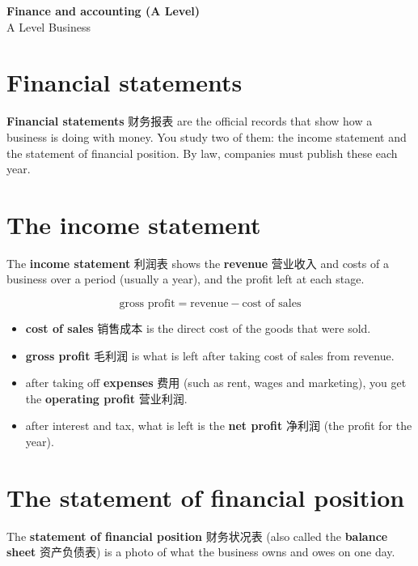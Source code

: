 \documentclass[11pt]{article}
\begin{document}
\begin{center}
  {\LARGE\bfseries Finance and accounting (A Level)}\\[0.35em]
  {\large A Level Business}
\end{center}
\vspace{0.6em}

\section*{Financial statements}

\textbf{Financial statements} 财务报表 are the official records that show how a business is doing with money. You study two of them: the income statement and the statement of financial position. By law, companies must publish these each year.

\section*{The income statement}

The \textbf{income statement} 利润表 shows the \textbf{revenue} 营业收入 and costs of a business over a period (usually a year), and the profit left at each stage.

\[
\text{gross profit} = \text{revenue} - \text{cost of sales}
\]

\begin{itemize}
\item \textbf{cost of sales} 销售成本 is the direct cost of the goods that were sold.

\item \textbf{gross profit} 毛利润 is what is left after taking cost of sales from revenue.

\item after taking off \textbf{expenses} 费用 (such as rent, wages and marketing), you get the \textbf{operating profit} 营业利润.

\item after interest and tax, what is left is the \textbf{net profit} 净利润 (the profit for the year).

\end{itemize}

\section*{The statement of financial position}

The \textbf{statement of financial position} 财务状况表 (also called the \textbf{balance sheet} 资产负债表) is a photo of what the business owns and owes on one day.
\end{document}
